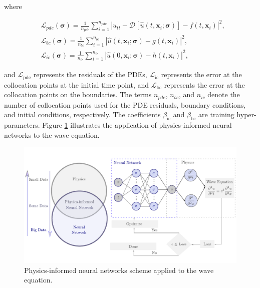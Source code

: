 \documentclass[11pt,twoside]{article}
\begin{document}
where

$$
\begin{aligned}
& \mathcal{L}_{pde}(\boldsymbol{\sigma})=\frac{1}{n_{pde}} \sum_{i=1}^{n_{pde}}\left|u_{tt} - 
\mathcal{D}\left[\hat{u}\left(t,\boldsymbol{x}_i ; \boldsymbol{\sigma}\right)\right]-f\left(t, \boldsymbol{x}_i\right)\right|^2, \\
& \mathcal{L}_{bc}(\boldsymbol{\sigma})=\frac{1}{n_{bc}} \sum_{i=1}^{n_{bc}}\left|\hat{u}\left(t, \boldsymbol{x}_i ;
 \boldsymbol{\sigma}\right)-g\left(t, \boldsymbol{x}_i\right)\right|^2, \\
& \mathcal{L}_{ic}(\boldsymbol{\sigma})=\frac{1}{n_{ic}} \sum_{i=1}^{n_{ic}}\left|\hat{u}\left(0, \boldsymbol{x}_i ;
 \boldsymbol{\sigma}\right)-h\left(t,\boldsymbol{x}_i\right)\right|^2,
\end{aligned}
$$

and \( \mathcal{L}_{\text{pde}} \) represents the residuals of the PDEs, \( \mathcal{L}_{\text{ic}} \) represents the error at the 
collocation points at the initial time point, and \( \mathcal{L}_{\text{bc}} \) represents the error at the collocation points 
on the boundaries. The terms \( n_{pde} \), \( n_{bc} \), and \( n_{ic} \) denote the number of collocation points used for the 
PDE residuals, boundary conditions, and initial conditions, respectively. The coefficients \(\beta_{\text{ic}}\) and \(\beta_{\text{bc}}\) 
are training hyper-parameters. Figure \ref{fig:physics_informed_neural_networks} illustrates the application of physics-informed 
neural networks to the wave equation.

\begin{figure}[h]
    \centering
        \includegraphics[width=1.0\textwidth]{figs/scheme_PINNs_waves.pdf}
        \caption{Physics-informed neural networks scheme applied to the wave equation.}
        \label{fig:physics_informed_neural_networks}
\end{figure}
    
\end{document}
